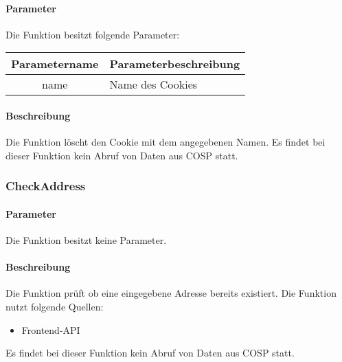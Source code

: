 \paragraph{Parameter} Die Funktion besitzt folgende Parameter:
\begin{table}[H]
	\begin{tabular}{|c|p{11cm}|}
		\hline
		\textbf{Parametername} & \textbf{Parameterbeschreibung} \\ \hline
		name & Name des Cookies \\ \hline
	\end{tabular}
\end{table}
\paragraph{Beschreibung} Die Funktion löscht den Cookie mit dem angegebenen Namen. Es findet bei dieser Funktion kein Abruf von Daten aus {\glqq COSP\grqq} statt.
\subsubsection{CheckAddress}
\paragraph{Parameter} Die Funktion besitzt keine Parameter.
\paragraph{Beschreibung} Die Funktion prüft ob eine eingegebene Adresse bereits existiert. Die Funktion nutzt folgende Quellen:
\begin{itemize}
	\item Frontend-API
\end{itemize}
Es findet bei dieser Funktion kein Abruf von Daten aus {\glqq COSP\grqq} statt.